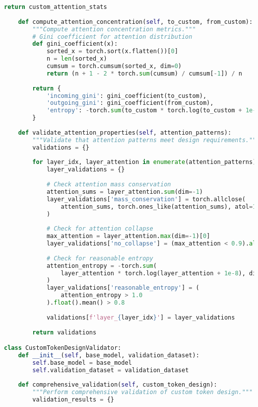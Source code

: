 \begin{lstlisting}[language=Python, caption=Attention pattern analysis for custom token design]
        return custom_attention_stats
    
    def compute_attention_concentration(self, to_custom, from_custom):
        """Compute attention concentration metrics."""
        # Gini coefficient for attention distribution
        def gini_coefficient(x):
            sorted_x = torch.sort(x.flatten())[0]
            n = len(sorted_x)
            cumsum = torch.cumsum(sorted_x, dim=0)
            return (n + 1 - 2 * torch.sum(cumsum) / cumsum[-1]) / n
        
        return {
            'incoming_gini': gini_coefficient(to_custom),
            'outgoing_gini': gini_coefficient(from_custom),
            'entropy': -torch.sum(to_custom * torch.log(to_custom + 1e-8))
        }
    
    def validate_attention_properties(self, attention_patterns):
        """Validate that attention patterns meet design requirements."""
        validations = {}
        
        for layer_idx, layer_attention in enumerate(attention_patterns):
            layer_validations = {}
            
            # Check attention mass conservation
            attention_sums = layer_attention.sum(dim=-1)
            layer_validations['mass_conservation'] = torch.allclose(
                attention_sums, torch.ones_like(attention_sums), atol=1e-6
            )
            
            # Check for attention collapse
            max_attention = layer_attention.max(dim=-1)[0]
            layer_validations['no_collapse'] = (max_attention < 0.9).all()
            
            # Check for reasonable entropy
            attention_entropy = -torch.sum(
                layer_attention * torch.log(layer_attention + 1e-8), dim=-1
            )
            layer_validations['reasonable_entropy'] = (
                attention_entropy > 1.0
            ).float().mean() > 0.8
            
            validations[f'layer_{layer_idx}'] = layer_validations
        
        return validations

class CustomTokenDesignValidator:
    def __init__(self, base_model, validation_dataset):
        self.base_model = base_model
        self.validation_dataset = validation_dataset
        
    def comprehensive_validation(self, custom_token_design):
        """Perform comprehensive validation of custom token design."""
        validation_results = {}
        

\end{lstlisting}
